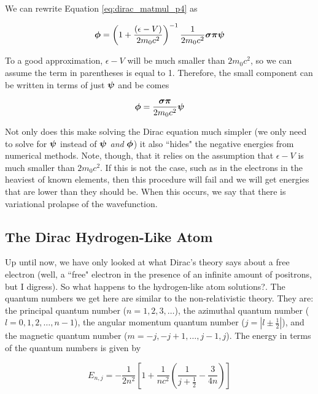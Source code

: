 \documentclass[12pt]{report}
\begin{document}
We can rewrite Equation \ref{eq:dirac_matmul_p4} as

\begin{equation}
\label{eq:dirac_small_comp}
{\bf{\phi}} = \left(1 + \frac{(\epsilon - V)}{2m_{0}c^{2}}\right)^{-1}\frac{1}{2m_{0}c^{2}}{\bf{\sigma\pi}}{\bf{\psi}}
\end{equation}

To a good approximation, $\epsilon - V$ will be much smaller than $2m_{0}c^{2}$, so we can assume the term in parentheses is equal to 1. Therefore, the small component can be written in terms of just ${\bf{\psi}}$ and be comes

\begin{equation}
\label{eq:dirac_small_comp_simp}
{\bf{\phi}} = \frac{{\bf{\sigma\pi}}}{2m_{0}c^{2}}{\bf{\psi}}
\end{equation}

Not only does this make solving the Dirac equation much simpler (we only need to solve for ${\bf{\psi}}$ instead of ${\bf{\psi}}$ \textit{and} ${\bf{\phi}}$) it also ``hides" the negative energies from numerical methods. Note, though, that it relies on the assumption that $\epsilon - V$ is much smaller than $2m_{0}c^{2}$. If this is not the case, such as in the electrons in the heaviest of known elements, then this procedure will fail and we will get energies that are lower than they should be. When this occurs, we say that there is variational prolapse of the wavefunction.

\subsection{The Dirac Hydrogen-Like Atom}
Up until now, we have only looked at what Dirac's theory says about a free electron (well, a ``free" electron in the presence of an infinite amount of positrons, but I digress). So what happens to the hydrogen-like atom solutions?. The quantum numbers we get here are similar to the non-relativistic theory. They are: the principal quantum number ($n=1,2,3,\ldots$), the azimuthal quantum number ($l = 0, 1, 2, \ldots, n-1$), the angular momentum quantum number ($j = | l \pm \frac{1}{2}|$), and the magnetic quantum number ($m = -j,-j+1, \ldots, j-1, j$). The energy in terms of the quantum numbers is given by\cite{Piela}

\begin{equation}
\label{eq:dirac_energy}
E_{n, j} = -\frac{1}{2n^{2}}\left[1+\frac{1}{nc^{2}}\left(\frac{1}{j+\frac{1}{2}}-\frac{3}{4n}\right)\right]
\end{equation}
\end{document}
